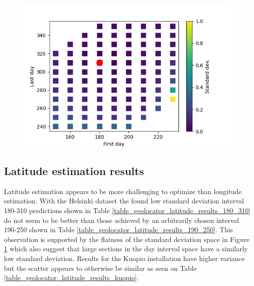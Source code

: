 



\begin{figure}[]
\centering
\includegraphics[width=0.8\linewidth]{pics/std_dev_helsinki_latitude}
\label{fig_heatmap3d2}
\end{figure}

\newpage

\subsection{Latitude estimation results}
Latitude estimation appears to be more challenging to optimize than longitude estimation. With the Helsinki dataset the found low standard deviation interval 180-310 predictions shown in Table \ref{table_geolocator_latitude_results_180_310} do not seem to be better than those achieved by an arbitrarily chosen interval 190-250 shown in Table \ref{table_geolocator_latitude_results_190_250}. This observation is supported by the flatness of the standard deviation space in Figure \ref{fig_heatmap3d2} which also suggest that large sections in the day interval space have a similarly low standard deviation. Results for the Kuopio installation have higher variance but the scatter appears to otherwise be similar as seen on Table \ref{table_geolocator_latitude_results_kuopio}.

